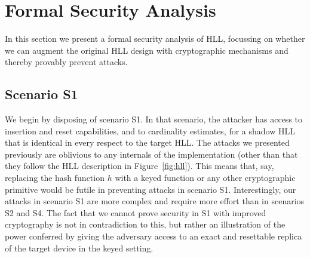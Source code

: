 \documentclass{article}
\begin{document}
\begin{table*}[tb!]
\small\centering
\caption{Attack results, averaged over 30 iterations, in the setting of~\cite{hllvuln}.}
\medskip
\label{table:tab2}
\end{table*}

\section{Formal Security Analysis}\label{sec:formal}

In this section we present a formal security analysis of HLL, focussing on whether we can augment the original HLL design with cryptographic mechanisms and thereby provably prevent attacks.

\subsection{Scenario S1}
We begin by disposing of scenario S1. In that scenario, the attacker has access to insertion and reset capabilities, and to cardinality estimates, for a shadow HLL that is identical in every respect to the target HLL. The attacks we presented previously are oblivious to any internals of the implementation (other than that they follow the HLL description in Figure~\ref{fig:hll}). This means that, say, replacing the hash function $h$ with a keyed function or any other cryptographic primitive would be futile in preventing attacks in scenario S1. Interestingly, our attacks in scenario S1 are more complex and require more effort than in scenarios S2 and S4. The fact that we cannot prove security in S1 with improved cryptography is not in contradiction to this, but rather an illustration of the power conferred by giving the adversary access to an exact and resettable replica of the target device in the keyed setting.
\end{document}
